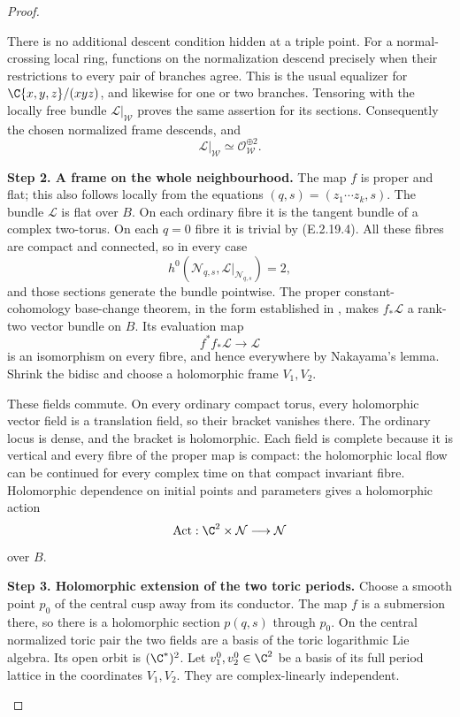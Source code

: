 \begin{proof}
\begin{enumerate}[label={$\langle1\rangle$\arabic*.},leftmargin=*]
There is no additional descent
condition hidden at a triple point.
For a normal-crossing local ring,
functions on the normalization
descend precisely when their
restrictions to every pair of
branches agree.  This is the usual
equalizer for
$\C\{x,y,z\}/(xyz)$, and likewise
for one or two branches.  Tensoring
with the locally free bundle
$\mathcal L|_{\mathcal W}$ proves
the same assertion for its sections.
Consequently the chosen normalized
frame descends, and
\[
 \mathcal L|_{\mathcal W}
       \simeq\mathcal O_{\mathcal W}^{\oplus2}.
 \tag{E.2.19.4}
\]

\noindent\textbf{Step 2. A frame on the whole neighbourhood.}
The map $f$ is proper and flat; this
also follows locally from the equations
$(q,s)=(z_1\cdots z_k,s)$.
The bundle $\mathcal L$ is flat over
$B$.  On each ordinary fibre it is
the tangent bundle of a complex
two-torus.  On each $q=0$ fibre it
is trivial by (E.2.19.4).  All these
fibres are compact and connected,
so in every case
\[
 h^0(\mathcal N_{q,s},
       \mathcal L|_{\mathcal N_{q,s}})=2,
\]
and those sections generate the
bundle pointwise.  The proper
constant-cohomology base-change
theorem, in the form established
in , makes $f_*\mathcal L$
a rank-two vector bundle on $B$.
Its evaluation map
\[
 f^*f_*\mathcal L\longrightarrow\mathcal L
 \tag{E.2.19.5}
\]
is an isomorphism on every fibre,
and hence everywhere by Nakayama's
lemma.  Shrink the bidisc and
choose a holomorphic frame $V_1,V_2$.

These fields commute.  On every
ordinary compact torus, every
holomorphic vector field is a
translation field, so their
bracket vanishes there.  The
ordinary locus is dense, and
the bracket is holomorphic.
Each field is complete because
it is vertical and every fibre
of the proper map is compact:
the holomorphic local flow can
be continued for every complex
time on that compact invariant
fibre.  Holomorphic dependence
on initial points and parameters
gives a holomorphic action
\[
 \operatorname{Act}:\C^2\times
       \mathcal N\longrightarrow\mathcal N
\]
over $B$.

\noindent\textbf{Step 3. Holomorphic extension of the two toric periods.}
Choose a smooth point $p_0$ of the
central cusp away from its conductor.
The map $f$ is a submersion there,
so there is a holomorphic section
$p(q,s)$ through $p_0$.
On the central normalized toric
pair the two fields are a basis
of the toric logarithmic Lie
algebra.  Its open orbit is
$(\C^*)^2$.  Let
$v_1^0,v_2^0\in\C^2$ be a
basis of its full period lattice
in the coordinates $V_1,V_2$.
They are complex-linearly
independent.


\end{enumerate}
\end{proof}
